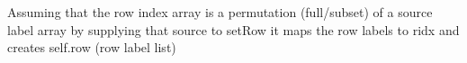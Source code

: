 \documentclass[letterpaper,10pt,english]{sphinxmanual}
\begin{document}
\begin{fulllineitems}
\begin{fulllineitems}
\end{fulllineitems}


\begin{fulllineitems}
\label{\detokenize{modules_doc:cbmpy.CBCommon.StructMatrix.setRow}}
\pysigstartsignatures
{}
\pysigstopsignatures
\sphinxAtStartPar
Assuming that the row index array is a permutation (full/subset)
of a source label array by supplying that source to setRow it
maps the row labels to ridx and creates self.row (row label list)

\end{fulllineitems}


\end{fulllineitems}

\end{document}

